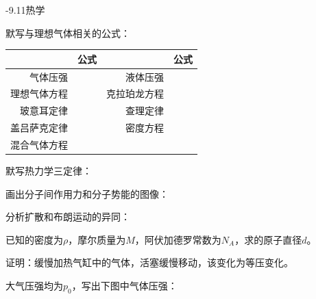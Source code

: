 {-9.11热学}

默写与理想气体相关的公式：
\begin{table}[htbp]
  \begin{tabular}{r p{4cm}|rp{4cm}}
    \toprule
    &公式&&公式\\
    \hline
    气体压强&&液体压强&\\
    \hline
    理想气体方程&&克拉珀龙方程&\\
    \hline
    玻意耳定律&&查理定律&\\
    \hline
    盖吕萨克定律&&密度方程&\\
    \hline
    混合气体方程&\multicolumn{3}{c}{}\\
    \bottomrule
  \end{tabular}
\end{table}

默写热力学三定律：
\vspace*{4cm}

画出分子间作用力和分子势能的图像：
\vspace*{4cm}

分析扩散和布朗运动的异同：
\vspace*{4cm}

已知的密度为\(\rho\)，摩尔质量为\(M\)，阿伏加德罗常数为\(N_A\)，求的原子直径\(d\)。

\newpage

证明：缓慢加热气缸中的气体，活塞缓慢移动，该变化为等压变化。
\vspace*{3cm}

大气压强均为\(p_0\)，写出下图中气体压强：

